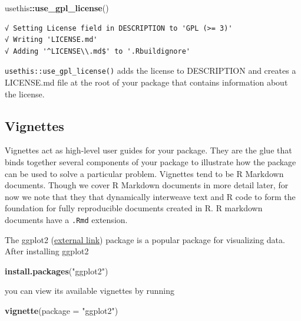 \documentclass[
]{book}
\newenvironment{Shaded}{\begin{snugshade}}{\end{snugshade}}
\newcommand{\DataTypeTok}[1]{\textcolor[rgb]{0.13,0.29,0.53}{#1}}
\newcommand{\KeywordTok}[1]{\textcolor[rgb]{0.13,0.29,0.53}{\textbf{#1}}}
\newcommand{\NormalTok}[1]{#1}
\newcommand{\OperatorTok}[1]{\textcolor[rgb]{0.81,0.36,0.00}{\textbf{#1}}}
\newcommand{\StringTok}[1]{\textcolor[rgb]{0.31,0.60,0.02}{#1}}
\begin{document}
\begin{Shaded}
\begin{Highlighting}[]
\NormalTok{usethis}\OperatorTok{::}\KeywordTok{use_gpl_license}\NormalTok{()}
\end{Highlighting}
\end{Shaded}

\begin{verbatim}
√ Setting License field in DESCRIPTION to 'GPL (>= 3)'
√ Writing 'LICENSE.md'
√ Adding '^LICENSE\\.md$' to '.Rbuildignore'
\end{verbatim}

\texttt{usethis::use\_gpl\_license()} adds the license to DESCRIPTION and creates a LICENSE.md file at the root of your package that contains information about the license.

\hypertarget{vignettes}{%
\subsection{Vignettes}\label{vignettes}}

Vignettes act as high-level user guides for your package. They are the glue that binds together several components of your package to illustrate how the package can be used to solve a particular problem. Vignettes tend to be R Markdown documents. Though we cover R Markdown documents in more detail later, for now we note that they that dynamically interweave text and R code to form the foundation for fully reproducible documents created in R. R markdown documents have a \texttt{.Rmd} extension.

The ggplot2 (\href{https://ggplot2.tidyverse.org/}{external link}) package is a popular package for visualizing data. After installing ggplot2

\begin{Shaded}
\begin{Highlighting}[]
\KeywordTok{install.packages}\NormalTok{(}\StringTok{"ggplot2"}\NormalTok{)}
\end{Highlighting}
\end{Shaded}

you can view its available vignettes by running

\begin{Shaded}
\begin{Highlighting}[]
\KeywordTok{vignette}\NormalTok{(}\DataTypeTok{package =} \StringTok{"ggplot2"}\NormalTok{)}
\end{Highlighting}
\end{Shaded}
\end{document}
